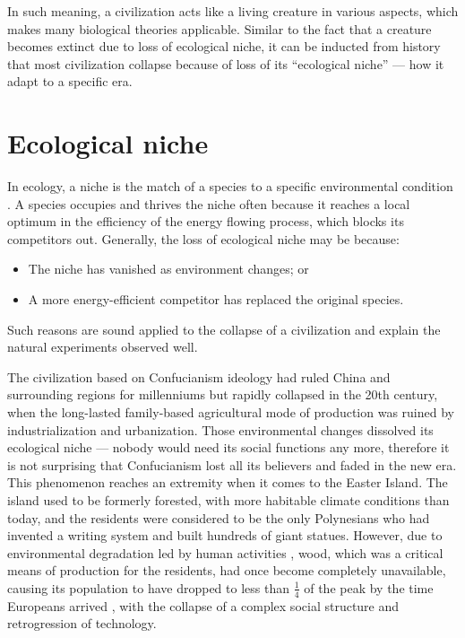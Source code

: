 \documentclass[a4paper,12pt]{article}
\begin{document}
    In such meaning, a civilization acts like a living creature in various aspects, which makes many biological theories applicable.
    Similar to the fact that a creature becomes extinct due to loss of ecological niche, it can be inducted from history that most civilization collapse because of loss of its ``ecological niche'' --- how it adapt to a specific era.
    
    \section{Ecological niche}
    In ecology, a niche is the match of a species to a specific environmental condition \cite{2015_TheEcoNiche}.
    A species occupies and thrives the niche often because it reaches a local optimum in the efficiency of the energy flowing process, which blocks its competitors out.
    Generally, the loss of ecological niche may be because:
    \begin{itemize}
        \item The niche has vanished as environment changes; or
        \item A more energy-efficient competitor has replaced the original species.
    \end{itemize}
    Such reasons are sound applied to the collapse of a civilization and explain the natural experiments observed well.
    
    The civilization based on Confucianism ideology had ruled China and surrounding regions for millenniums but rapidly collapsed in the 20th century, when the long-lasted family-based agricultural mode of production was ruined by industrialization and urbanization.
    Those environmental changes dissolved its ecological niche --- nobody would need its social functions any more, therefore it is not surprising that Confucianism lost all its believers and faded in the new era.
    This phenomenon reaches an extremity when it comes to the Easter Island.
    The island used to be formerly forested, with more habitable climate conditions than today, and the residents were considered to be the only Polynesians who had invented a writing system and built hundreds of giant statues.
    However, due to environmental degradation led by human activities \cite{1991_ClimaticEasterIsland}, wood, which was a critical means of production for the residents, had once become completely unavailable, causing its population to have dropped to less than $\frac 1 4$ of the peak by the time Europeans arrived \cite{2005_TheRapeOfRapaNui}, with the collapse of a complex social structure and retrogression of technology.
    
\end{document}
